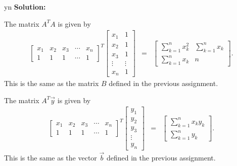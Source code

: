 \documentclass[12pt]{article}
\def\solutions{y}
\def\solutions{n}
\begin{document}
\if y\solutions
\textbf{Solution:} 

The matrix $A^TA$ is given by
\begin{eqnarray*}
      \left[
      \begin{array}{rrrrr}
        x_1 & x_2 & x_3 & \cdots & x_n  \\
        1   & 1   & 1   & \cdots & 1
      \end{array}
    \right]^T
    \left[
      \begin{array}{rr}
        x_1 & 1 \\
        x_2 & 1 \\
        x_3 & 1 \\
        \vdots & \vdots \\
        x_n & 1
      \end{array}
    \right]
    & = & 
    \left[
      \begin{array}{rr}
        \sum^n_{k=1} x_k^2 & \sum^n_{k=1} x_k \\
        \sum^n_{k=1} x_k & n
      \end{array}
    \right].
\end{eqnarray*}
This is the same as the matrix $B$ defined in the previous
assignment. 

The matrix $A^T\vec{y}$ is  given by
\begin{eqnarray*}
      \left[
      \begin{array}{rrrrr}
        x_1 & x_2 & x_3 & \cdots & x_n  \\
        1   & 1   & 1   & \cdots & 1
      \end{array}
    \right]^T
      \left[
      \begin{array}{r}
        y_1 \\
        y_2 \\
        y_3 \\
        \vdots  \\
        y_n 
      \end{array}
    \right] & = & 
    \left[
      \begin{array}{r}
        \sum^n_{k=1} x_k y_k \\ \sum^n_{k=1} y_k
      \end{array}
    \right].
\end{eqnarray*}
This is the same as the vector $\vec{b}$ defined in the previous assignment.

\fi






\end{document}
